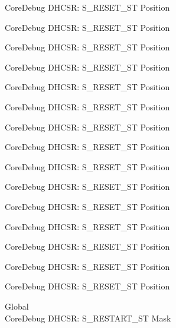 \begin{DoxyRefList}
\label{deprecated__deprecated000109}%
%
Core\+Debug DHCSR\+: S\+\_\+\+RESET\+\_\+\+ST Position 

\label{deprecated__deprecated000163}%
%
Core\+Debug DHCSR\+: S\+\_\+\+RESET\+\_\+\+ST Position 

\label{deprecated__deprecated000248}%
%
Core\+Debug DHCSR\+: S\+\_\+\+RESET\+\_\+\+ST Position 

\label{deprecated__deprecated000305}%
%
Core\+Debug DHCSR\+: S\+\_\+\+RESET\+\_\+\+ST Position 

\label{deprecated__deprecated000381}%
%
Core\+Debug DHCSR\+: S\+\_\+\+RESET\+\_\+\+ST Position 

\label{deprecated__deprecated000460}%
%
Core\+Debug DHCSR\+: S\+\_\+\+RESET\+\_\+\+ST Position 

\label{deprecated__deprecated000562}%
%
Core\+Debug DHCSR\+: S\+\_\+\+RESET\+\_\+\+ST Position 

\label{deprecated__deprecated000687}%
%
Core\+Debug DHCSR\+: S\+\_\+\+RESET\+\_\+\+ST Position 

\label{deprecated__deprecated000787}%
%
Core\+Debug DHCSR\+: S\+\_\+\+RESET\+\_\+\+ST Position 

\label{deprecated__deprecated000841}%
%
Core\+Debug DHCSR\+: S\+\_\+\+RESET\+\_\+\+ST Position 

\label{deprecated__deprecated000926}%
%
Core\+Debug DHCSR\+: S\+\_\+\+RESET\+\_\+\+ST Position 

\label{deprecated__deprecated000983}%
%
Core\+Debug DHCSR\+: S\+\_\+\+RESET\+\_\+\+ST Position 

\label{deprecated__deprecated001059}%
%
Core\+Debug DHCSR\+: S\+\_\+\+RESET\+\_\+\+ST Position 

\label{deprecated__deprecated001138}%
%
Core\+Debug DHCSR\+: S\+\_\+\+RESET\+\_\+\+ST Position 

\label{deprecated__deprecated001240}%
%
Core\+Debug DHCSR\+: S\+\_\+\+RESET\+\_\+\+ST Position  
\item[Global \doxylink{group___c_m_s_i_s___s_c_b_gabe3254d40aaa482987ff31584d2a3240}{Core\+Debug\+\_\+\+DHCSR\+\_\+\+S\+\_\+\+RESTART\+\_\+\+ST\+\_\+\+Msk} ]\hfill \\
\label{deprecated__deprecated000008}%
%
Core\+Debug DHCSR\+: S\+\_\+\+RESTART\+\_\+\+ST Mask 


\end{DoxyRefList}
